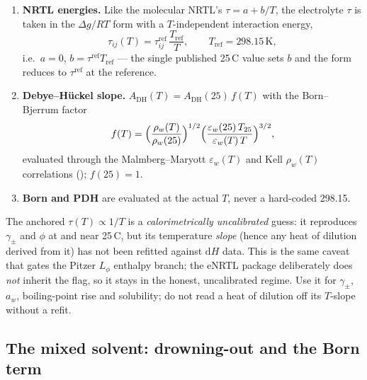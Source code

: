 \documentclass[11pt,a4paper]{article}
\begin{document}
\begin{enumerate}[leftmargin=*,nosep,topsep=2pt]
  \item \textbf{NRTL energies.}  Like the molecular NRTL's
        $\tau = a + b/T$, the electrolyte $\tau$ is taken in the
        $\Delta g/RT$ form with a $T$-independent interaction energy,
        \begin{equation}
           \tau_{ij}(T) = \tau_{ij}^{\mathrm{ref}}\,\frac{T_{\mathrm{ref}}}{T},
           \qquad T_{\mathrm{ref}} = 298.15\,\mathrm K,
        \end{equation}
        i.e.\ $a=0$, $b = \tau^{\mathrm{ref}} T_{\mathrm{ref}}$ --- the
        single published 25\,\textdegree C value sets $b$ and the form
        reduces to $\tau^{\mathrm{ref}}$ at the reference.
  \item \textbf{Debye--H\"uckel slope.}  $A_{\mathrm{DH}}(T) =
        A_{\mathrm{DH}}(25)\,f(T)$ with the Born--Bjerrum factor
        \begin{equation}
           f(T) = \Bigl(\frac{\rho_w(T)}{\rho_w(25)}\Bigr)^{1/2}
                  \Bigl(\frac{\varepsilon_w(25)\,T_{25}}{\varepsilon_w(T)\,T}\Bigr)^{3/2},
        \end{equation}
        evaluated through the Malmberg--Maryott $\varepsilon_w(T)$ and
        Kell $\rho_w(T)$ correlations
        (); $f(25)=1$.
  \item \textbf{Born and PDH} are evaluated at the actual $T$, never a
        hard-coded 298.15.
\end{enumerate}

\begin{pitfall}
The anchored $\tau(T) \propto 1/T$ is a \emph{calorimetrically
uncalibrated} guess: it reproduces $\gamma_\pm$ and $\phi$ at and near
25\,\textdegree C, but its temperature \emph{slope} (hence any heat of
dilution derived from it) has not been refitted against
$\mathrm{d}H$ data.  This is the same caveat that gates the Pitzer
$L_\phi$ enthalpy branch; the eNRTL package deliberately does \emph{not}
inherit the  flag, so it stays in the honest,
uncalibrated regime.  Use it for $\gamma_\pm$, $a_w$, boiling-point rise
and solubility; do not read a heat of dilution off its $T$-slope without
a refit.
\end{pitfall}

\subsection{The mixed solvent: drowning-out and the Born
term}\label{sec:enrtl-mixed}
\end{document}

